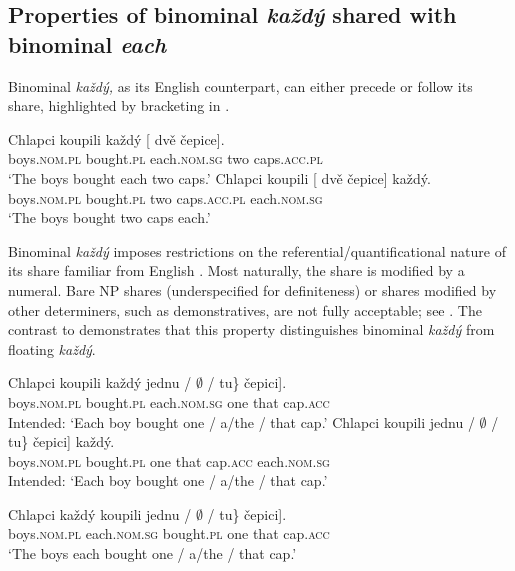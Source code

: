 \documentclass[output=paper,colorlinks,citecolor=brown,newtxmath]{langscibook}
\begin{document}
\subsection{Properties of binominal \textit{každý} shared with binominal \textit{each}}\label{s2.1}

Binominal \textit{každý,} as its English counterpart, can either precede or follow its share, highlighted by bracketing in .

\ea\label{ex:pre-post-share}\ea\gll Chlapci koupili každý [\hspace{-2.5pt} dvě čepice].\\
boys.\textsc{nom.pl} bought.\textsc{pl} each.\textsc{nom.sg} {} two caps.\textsc{acc.pl}\\
\glt `The boys bought each two caps.'
\ex\gll Chlapci koupili [\hspace{-2.5pt} dvě čepice] každý.\\
boys.\textsc{nom.pl} bought.\textsc{pl} {} two caps.\textsc{acc.pl} each.\textsc{nom.sg}\\
\glt `The boys bought two caps each.'
\z\z

\noindent Binominal \textit{každý} imposes restrictions on the referential/quantificational nature of its share familiar from English \citep[428]{Safir1988}. Most naturally, the share is modified by a numeral. Bare NP shares (underspecified for definiteness) or shares modified by other determiners, such as demonstratives, are not fully acceptable; see . The contrast to  demonstrates that this property distinguishes binominal \textit{každý} from floating \textit{každý}.

\ea\label{ex:ref-share}\ea\gll Chlapci koupili každý \minsp{[\{} jednu /  $\emptyset$ /  tu\} čepici].\\
boys.\textsc{nom.pl} bought.\textsc{pl} each.\textsc{nom.sg} {} one {} {} {} {} {} that cap.\textsc{acc}\\
\glt Intended: `Each boy bought one / a/the / that cap.'
\ex\gll Chlapci koupili \minsp{[\{} jednu /  $\emptyset$ /  tu\} čepici] každý.\\
boys.\textsc{nom.pl} bought.\textsc{pl} {} one {} {} {} {} {} that cap.\textsc{acc} each.\textsc{nom.sg}\\
\glt Intended: `Each boy bought one / a/the / that cap.'
\z\z

\ea\label{ex:ref-float}\gll Chlapci každý \minsp{[} koupili \minsp{\{} jednu / $\emptyset$ / tu\} čepici].\\
boys.\textsc{nom.pl} each.\textsc{nom.sg} {} bought.\textsc{pl} {} one {} {} {} that cap.\textsc{acc}\\
\glt `The boys each bought one / a/the / that cap.'
\z
\end{document}
